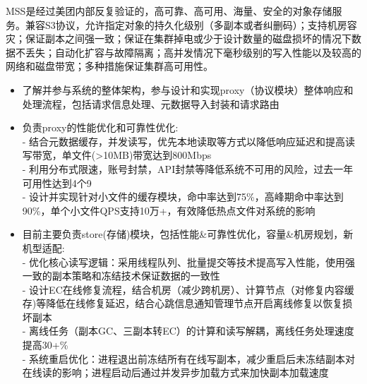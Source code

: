 \documentclass{resume}
\begin{document}
MSS是经过美团内部反复验证的，高可靠、高可用、海量、安全的对象存储服务。兼容S3协议，允许指定对象的持久化级别（多副本或者纠删码）；支持机房容灾；保证副本之间强一致；保证在集群掉电或少于设计数量的磁盘损坏的情况下数据不丢失；自动化扩容与故障隔离；高并发情况下毫秒级别的写入性能以及较高的网络和磁盘带宽；多种措施保证集群高可用性。
\begin{itemize}
  \item 了解并参与系统的整体架构，参与设计和实现proxy（协议模块）整体响应和处理流程，包括请求信息处理、元数据导入封装和请求路由
\end{itemize}
\begin{itemize}
  \item 负责proxy的性能优化和可靠性优化:\\
  - 结合元数据缓存，并发读写，优先本地读取等方式以降低响应延迟和提高读写带宽，单文件(>10MB)带宽达到800Mbps\\
  - 利用分布式限速，账号封禁，API封禁等降低系统不可用的风险，过去一年可用性达到4个9\\
  - 设计并实现针对小文件的缓存模块，命中率达到75\%，高峰期命中率达到90\%，单个小文件QPS支持10万+，有效降低热点文件对系统的影响
\end{itemize}
\begin{itemize}
  \item 目前主要负责store(存储)模块，包括性能\&可靠性优化，容量\&机房规划，新机型适配:\\
  - 优化核心读写逻辑：采用线程队列、批量提交等技术提高写入性能，使用强一致的副本策略和冻结技术保证数据的一致性\\
  - 设计EC在线修复流程，结合机房（减少跨机房）、计算节点（对修复内容缓存)等降低在线修复延迟，结合心跳信息通知管理节点开启离线修复以恢复损坏副本\\
  - 离线任务（副本GC、三副本转EC）的计算和读写解耦，离线任务处理速度提高30+\%\\
  - 系统重启优化：进程退出前冻结所有在线写副本，减少重启后未冻结副本对在线读的影响；进程启动后通过并发异步加载方式来加快副本加载速度
\end{itemize}

\end{document}
